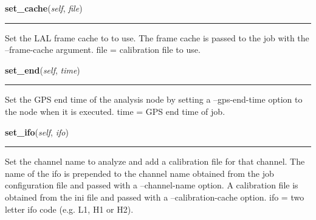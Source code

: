     \label{pipeline:AnalysisNode:set_cache}
    \vspace{0.5ex}

    \noindent\begin{boxedminipage}{\textwidth}

    \raggedright \textbf{set\_cache}(\textit{self}, \textit{file})

    \vspace{-1.5ex}

    \rule{\textwidth}{0.5\fboxrule}
    Set the LAL frame cache to to use. The frame cache is passed to the 
    job with the --frame-cache argument. file = calibration file to use.

    \vspace{1ex}

    \end{boxedminipage}

    \label{pipeline:AnalysisNode:set_end}
    \vspace{0.5ex}

    \noindent\begin{boxedminipage}{\textwidth}

    \raggedright \textbf{set\_end}(\textit{self}, \textit{time})

    \vspace{-1.5ex}

    \rule{\textwidth}{0.5\fboxrule}
    Set the GPS end time of the analysis node by setting a --gps-end-time 
    option to the node when it is executed. time = GPS end time of job.

    \vspace{1ex}

    \end{boxedminipage}

    \label{pipeline:AnalysisNode:set_ifo}
    \vspace{0.5ex}

    \noindent\begin{boxedminipage}{\textwidth}

    \raggedright \textbf{set\_ifo}(\textit{self}, \textit{ifo})

    \vspace{-1.5ex}

    \rule{\textwidth}{0.5\fboxrule}
    Set the channel name to analyze and add a calibration file for that 
    channel. The name of the ifo is prepended to the channel name 
    obtained from the job configuration file and passed with a 
    --channel-name option. A calibration file is obtained from the ini 
    file and passed with a --calibration-cache option. ifo = two letter 
    ifo code (e.g. L1, H1 or H2).

    \vspace{1ex}

    \end{boxedminipage}

